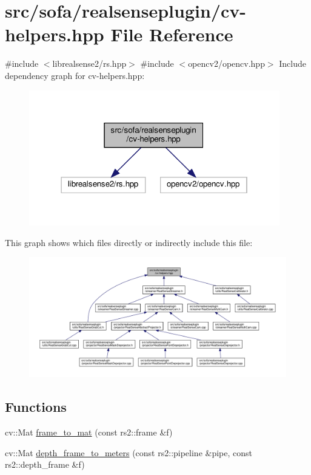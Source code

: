 \hypertarget{cv-helpers_8hpp}{}\section{src/sofa/realsenseplugin/cv-\/helpers.hpp File Reference}
\label{cv-helpers_8hpp}
{\ttfamily \#include $<$librealsense2/rs.\+hpp$>$}\newline
{\ttfamily \#include $<$opencv2/opencv.\+hpp$>$}\newline
Include dependency graph for cv-\/helpers.hpp\+:\nopagebreak
\begin{figure}[H]
\begin{center}
\leavevmode
\includegraphics[width=310pt]{cv-helpers_8hpp__incl}
\end{center}
\end{figure}
This graph shows which files directly or indirectly include this file\+:\nopagebreak
\begin{figure}[H]
\begin{center}
\leavevmode
\includegraphics[width=350pt]{cv-helpers_8hpp__dep__incl}
\end{center}
\end{figure}
\subsection*{Functions}
\begin{DoxyCompactItemize}
\item 
cv\+::\+Mat \hyperlink{cv-helpers_8hpp_a9f7789d2d48f2a70a8075f81e6b79a85}{frame\+\_\+to\+\_\+mat} (const rs2\+::frame \&f)
\item 
cv\+::\+Mat \hyperlink{cv-helpers_8hpp_a7e9d970007238e5460324343841905aa}{depth\+\_\+frame\+\_\+to\+\_\+meters} (const rs2\+::pipeline \&pipe, const rs2\+::depth\+\_\+frame \&f)
\end{DoxyCompactItemize}


